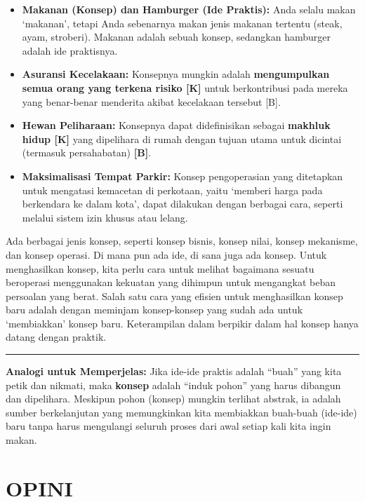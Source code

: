 \documentclass[
  letterpaper,
  DIV=11,
  numbers=noendperiod]{scrreprt}
\providecommand{\tightlist}{%
  \setlength{\itemsep}{0pt}\setlength{\parskip}{0pt}}
\begin{document}
\begin{itemize}
\tightlist
\item
  \textbf{Makanan (Konsep) dan Hamburger (Ide Praktis):} Anda selalu
  makan `makanan', tetapi Anda sebenarnya makan jenis makanan tertentu
  (steak, ayam, stroberi). Makanan adalah sebuah konsep, sedangkan
  hamburger adalah ide praktisnya.
\item
  \textbf{Asuransi Kecelakaan:} Konsepnya mungkin adalah
  \textbf{mengumpulkan semua orang yang terkena risiko {[}K{]}} untuk
  berkontribusi pada mereka yang benar-benar menderita akibat kecelakaan
  tersebut {[}B{]}.
\item
  \textbf{Hewan Peliharaan:} Konsepnya dapat didefinisikan sebagai
  \textbf{makhluk hidup {[}K{]}} yang dipelihara di rumah dengan tujuan
  utama untuk dicintai (termasuk persahabatan) \textbf{{[}B{]}}.
\item
  \textbf{Maksimalisasi Tempat Parkir:} Konsep pengoperasian yang
  ditetapkan untuk mengatasi kemacetan di perkotaan, yaitu `memberi
  harga pada berkendara ke dalam kota', dapat dilakukan dengan berbagai
  cara, seperti melalui sistem izin khusus atau lelang.
\end{itemize}

Ada berbagai jenis konsep, seperti konsep bisnis, konsep nilai, konsep
mekanisme, dan konsep operasi. Di mana pun ada ide, di sana juga ada
konsep. Untuk menghasilkan konsep, kita perlu cara untuk melihat
bagaimana sesuatu beroperasi menggunakan kekuatan yang dihimpun untuk
mengangkat beban persoalan yang berat. Salah satu cara yang efisien
untuk menghasilkan konsep baru adalah dengan meminjam konsep-konsep yang
sudah ada untuk `membiakkan' konsep baru. Keterampilan dalam berpikir
dalam hal konsep hanya datang dengan praktik.

\begin{center}\rule{0.5\linewidth}{0.5pt}\end{center}

\textbf{Analogi untuk Memperjelas:} Jika ide-ide praktis adalah ``buah''
yang kita petik dan nikmati, maka \textbf{konsep} adalah ``induk pohon''
yang harus dibangun dan dipelihara. Meskipun pohon (konsep) mungkin
terlihat abstrak, ia adalah sumber berkelanjutan yang memungkinkan kita
membiakkan buah-buah (ide-ide) baru tanpa harus mengulangi seluruh
proses dari awal setiap kali kita ingin makan.

\section{OPINI}\label{opini}
\end{document}

